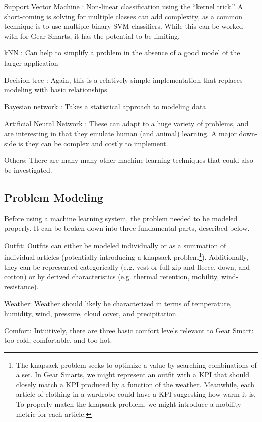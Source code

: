 \begin{description}
  \item{Support Vector Machine \cite{SVM}:} Non-linear classification using the ``kernel trick.'' A short-coming is solving for multiple
  classes can add complexity, as a common technique is to use multiple binary SVM classifiers. While this can be worked with
  for Gear Smarts, it has the potential to be limiting.
  \item{kNN \cite{KNN}:} Can help to simplify a problem in the absence of a good model of the larger application
  \item{Decision tree \cite{DecisionTree}:} Again, this is a relatively simple implementation that replaces modeling with basic relationships
  \item{Bayesian network \cite{BayesianNetwork}:} Takes a statistical approach to modeling data
  \item{Artificial Neural Network \cite{ANN}:} These can adapt to a huge variety of problems, and are interesting in that they emulate
  human (and animal) learning. A major down-side is they can be complex and costly to implement.
  \item{Others:} There are many many other machine learning techniques that could also be investigated.
\end{description}

\subsection{Problem Modeling}
Before using a machine learning system, the problem needed to be modeled properly. It can be broken down into three
fundamental parts, described below.

\begin{description}
  \item{Outfit:} Outfits can either be modeled individually or as a summation of individual articles (potentially introducing
  a knapsack problem\footnote{The knapsack problem seeks to optimize a value by searching combinations of a set. In Gear Smarts,
  we might represent an outfit with a KPI that should closely match a KPI produced by a function of the weather. Meanwhile, each
  article of clothing in a wardrobe could have a KPI suggesting how warm it is. To properly match the knapsack problem, we might
  introduce a mobility metric for each article.}).
  Additionally, they can be represented categorically (e.g. vest or full-zip and
  fleece, down, and cotton) or by derived characteristics (e.g. thermal retention, mobility, wind-resistance).
  \item{Weather:} Weather should likely be characterized in terms of temperature, humidity, wind, pressure,
  cloud cover, and precipitation.
  \item{Comfort:} Intuitively, there are three basic comfort levels relevant to Gear Smart: too cold, comfortable, and too hot.
\end{description}

